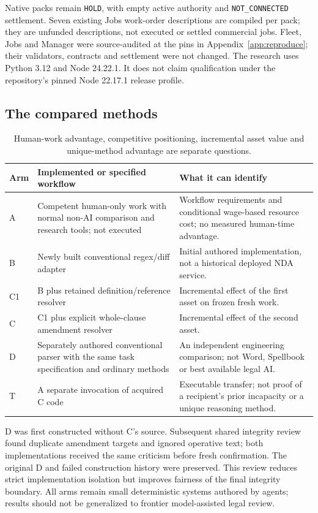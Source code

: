 \documentclass[10pt,a4paper]{article}
\begin{document}
Native packs remain \texttt{HOLD}, with empty active authority and \texttt{NOT\_CONNECTED} settlement. Seven existing Jobs work-order descriptions are compiled per pack; they are unfunded descriptions, not executed or settled commercial jobs. Fleet, Jobs and Manager were source-audited at the pins in Appendix~\ref{app:reproduce}; their validators, contracts and settlement were not changed. The research uses Python 3.12 and Node 24.22.1. It does not claim qualification under the repository's pinned Node 22.17.1 release profile.

\subsection{The compared methods}
\begin{table}[H]\small
\begin{tabularx}{\textwidth}{@{}p{}YY@{}}\toprule
\textbf{Arm} & \textbf{Implemented or specified workflow} & \textbf{What it can identify}\\\midrule
A & Competent human-only work with normal non-AI comparison and research tools; not executed & Workflow requirements and conditional wage-based resource cost; no measured human-time advantage.\\
B & Newly built conventional regex/diff adapter & Initial authored implementation, not a historical deployed NDA service.\\
C1 & B plus retained definition/reference resolver & Incremental effect of the first asset on frozen fresh work.\\
C & C1 plus explicit whole-clause amendment resolver & Incremental effect of the second asset.\\
D & Separately authored conventional parser with the same task specification and ordinary methods & An independent engineering comparison; not Word, Spellbook or best available legal AI.\\
T & A separate invocation of acquired C code & Executable transfer; not proof of a recipient's prior incapacity or a unique reasoning method.\\\bottomrule
\end{tabularx}
\caption{Human-work advantage, competitive positioning, incremental asset value and unique-method advantage are separate questions.}
\end{table}

D was first constructed without C's source. Subsequent shared integrity review found duplicate amendment targets and ignored operative text; both implementations received the same criticism before fresh confirmation. The original D and failed construction history were preserved. This review reduces strict implementation isolation but improves fairness of the final integrity boundary. All arms remain small deterministic systems authored by agents; results should not be generalized to frontier model-assisted legal review.
\end{document}
